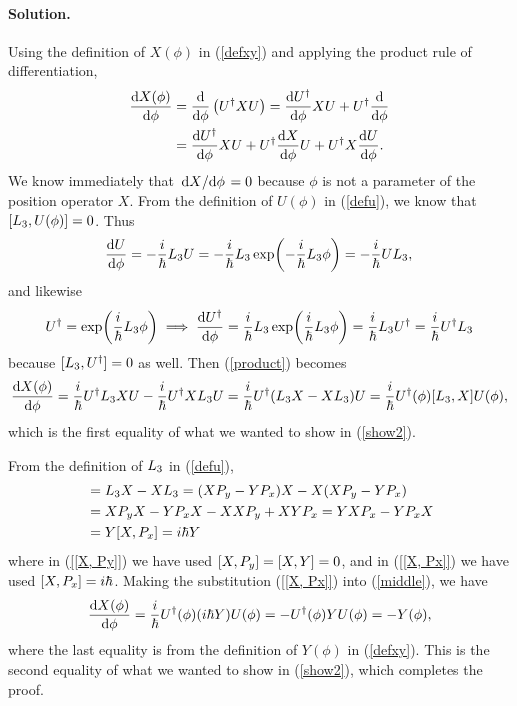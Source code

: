 \documentclass[11pt]{article}
\newcommand{\refeq}[1]{(\ref{#1})}
\newenvironment{solution}
{
    \paragraph{Solution.}
    \ignorespaces
}
{
}
\begin{document}
\begin{solution}
	Using the definition of $X(\phi)$ in \refeq{defxy} and applying the product rule of differentiation,
	\begin{align}
		\dv{X(\phi)}{\phi} &= \dv{}{\phi} \left( U^\dagger X U \right) = \dv{U^\dagger}{\phi} X U + U^\dagger \dv{}{\phi} (X U) \\
		&= \dv{U^\dagger}{\phi} X U + U^\dagger \dv{X}{\phi} U + U^\dagger X \dv{U}{\phi}. \label{product}
	\end{align}
	We know immediately that $\dv*{X}{\phi} = 0$ because $\phi$ is not a parameter of the position operator $X$.  From the definition of $U(\phi)$ in \refeq{defu}, we know that $[L_3, U(\phi)] = 0$.  Thus
	\begin{equation} \label{oper}
		\dv{U}{\phi} = -\frac{i}{\hbar} L_3 U = -\frac{i}{\hbar} L_3 \exp(-\frac{i}{\hbar} L_3 \phi) = -\frac{i}{\hbar} U L_3, \\
	\end{equation}
	and likewise
	\begin{equation}
		U^\dagger = \exp(\frac{i}{\hbar} L_3 \phi) \implies \dv{U^\dagger}{\phi} = \frac{i}{\hbar} L_3 \exp(\frac{i}{\hbar} L_3 \phi) = \frac{i}{\hbar} L_3 U^\dagger = \frac{i}{\hbar} U^\dagger L_3
	\end{equation}
	because $[L_3, U^\dagger] = 0$ as well.  Then \refeq{product} becomes
	\begin{equation}
		\dv{X(\phi)}{\phi} = \frac{i}{\hbar} U^\dagger L_3 X U - \frac{i}{\hbar} U^\dagger X L_3 U = \frac{i}{\hbar} U^\dagger (L_3 X - X L_3) U = \frac{i}{\hbar} U^\dagger(\phi) [L_3, X] U(\phi), \label{middle}
	\end{equation}
	which is the first equality of what we wanted to show in \refeq{show2}.
	
	From the definition of $L_3$ in \refeq{defu},
	\begin{align}
		[\Le, X] &= \Le X - X \Le = (X \Py - Y \Px) X - X (X \Py - Y \Px) \\
		&= X \Py X - Y \Px X - X X \Py + X Y \Px = Y X \Px - Y \Px X \label{[X, Py]} \\
		&= Y [X, \Px] = \ihb Y \label{[X, Px]}
	\end{align}
	where in \refeq{[X, Py]} we have used $[X, P_y] = [X, Y] = 0$, and in \refeq{[X, Px]} we have used $[X, P_x] = i \hbar$.  Making the substitution \refeq{[X, Px]} into \refeq{middle}, we have
	\begin{equation}
		\dv{X(\phi)}{\phi} = \frac{i}{\hbar} U^\dagger(\phi) (i \hbar Y) U(\phi) = -U^\dagger(\phi) Y U(\phi) = -Y(\phi),
	\end{equation}
	where the last equality is from the definition of $Y(\phi)$ in \refeq{defxy}.  This is the second equality of what we wanted to show in \refeq{show2}, which completes the proof.
	

\end{solution}
\end{document}
